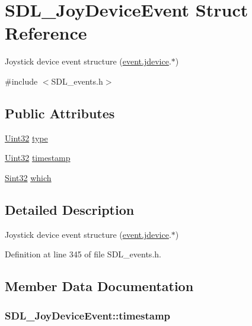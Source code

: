 \hypertarget{struct_s_d_l___joy_device_event}{\section{S\-D\-L\-\_\-\-Joy\-Device\-Event Struct Reference}
\label{struct_s_d_l___joy_device_event}
}


Joystick device event structure (\hyperlink{union_s_d_l___event_a17514dc19a846ea1b5fbe44123700c4c}{event.\-jdevice}.$\ast$)  




{\ttfamily \#include $<$S\-D\-L\-\_\-events.\-h$>$}

\subsection*{Public Attributes}
\begin{DoxyCompactItemize}
\item 
\hyperlink{_s_d_l__stdinc_8h_add440eff171ea5f55cb00c4a9ab8672d}{Uint32} \hyperlink{struct_s_d_l___joy_device_event_a51f060ba1dd5669b458e9c97aece667e}{type}
\item 
\hyperlink{_s_d_l__stdinc_8h_add440eff171ea5f55cb00c4a9ab8672d}{Uint32} \hyperlink{struct_s_d_l___joy_device_event_a5c4a9271bfff5d5c2e09a0dc732df8f3}{timestamp}
\item 
\hyperlink{_s_d_l__stdinc_8h_a7a90b941db9d4582e9ad7abb9940ff7e}{Sint32} \hyperlink{struct_s_d_l___joy_device_event_af9b295798f033b799ebbda7de6cb5a7e}{which}
\end{DoxyCompactItemize}


\subsection{Detailed Description}
Joystick device event structure (\hyperlink{union_s_d_l___event_a17514dc19a846ea1b5fbe44123700c4c}{event.\-jdevice}.$\ast$) 

Definition at line 345 of file S\-D\-L\-\_\-events.\-h.



\subsection{Member Data Documentation}
\hypertarget{struct_s_d_l___joy_device_event_a5c4a9271bfff5d5c2e09a0dc732df8f3}{
\subsubsection[{timestamp}]{ S\-D\-L\-\_\-\-Joy\-Device\-Event\-::timestamp}}\label{struct_s_d_l___joy_device_event_a5c4a9271bfff5d5c2e09a0dc732df8f3}


